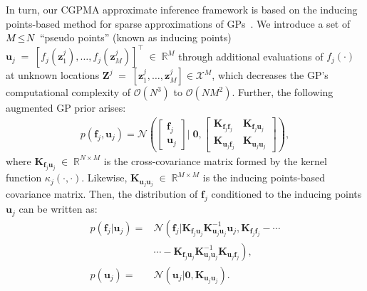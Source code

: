 \documentclass[journal]{IEEEtran}
\providecommand{\ve}[1]{{\bm{#1}}}%
\providecommand{\mat}[1]{{\bm{#1}}} %
\newcommand{\Real}{\mathbb{R}}
\DeclareMathOperator{\en}{\!\,\in\!\,}
\DeclareMathOperator{\igual}{\!\,=\!\,}
\providecommand{\s}[1]{\negthinspace#1\negthinspace}%
\providecommand{\ve}[1]{{\mathbf{#1}}}
\providecommand{\mat}[1]{{\mathbf{#1}}}
\newcommand{\gauss}{\mathcal{N}} %
\begin{document}
In turn, our CGPMA approximate inference framework is based on the inducing points-based method for sparse approximations of GPs~\cite{hensman2015scalable}. We introduce a set of $M\s{\leq}N$ ``pseudo points'' (known as inducing points) $\ve{u}_j \igual [f_j(\ve{z}_1^j), \dots , f_j(\ve{z}_M^j)]^{\top}\en \Real^{M}$ through additional evaluations of $f_j(\cdot)$ at unknown locations $\mat{Z}^j \igual [\ve{z}_1^j, \dots , \ve{z}_M^j]\in \mathcal{X}^{M}$, which decreases the GP's computational complexity of $\mathcal{O}(N^3)$ to $\mathcal{O}(NM^2)$. Further, the following augmented GP prior arises:
\begin{align}
p(\ve{f}_j,\ve{u}_j) = \gauss\left(\begin{bmatrix}
\ve{f}_j\\\ve{u}_j\end{bmatrix} \Bigg|\; \mathbf{0}, \begin{bmatrix}
\mat{K}_{\ve{f}_j\ve{f}_j} & \mat{K}_{\ve{f}_j\ve{u}_j}\\ \mat{K}_{\ve{u}_j\ve{f}_j} & \mat{K}_{\ve{u}_j\ve{u}_j}
\end{bmatrix}\right),
\end{align}
where $\mat{K}_{\ve{f}_j\ve{u}_j}\en\Real^{N\times M}$ is the cross-covariance matrix formed by the kernel function $\kappa_j(\cdot, \cdot)$. Likewise, $\mat{K}_{\ve{u}_j\ve{u}_j}\en\Real^{M\times M}$ is the inducing points-based covariance matrix. Then, the distribution of $\ve{f}_j$ conditioned to the inducing points $\ve{u}_j$ can be written as:
\begin{align}
\label{eq:FgU}
p(\ve{f}_j|\ve{u}_j) =&\gauss\left(\ve{f}_j|\mat{K}_{\ve{f}_j\ve{u}_j}\mat{K}_{\ve{u}_j\ve{u}_j}^{-1}\ve{u}_j,\mat{K}_{\ve{f}_j\ve{f}_j}-\cdots\right.\\ \nonumber
&\left.\cdots-\mat{K}_{\ve{f}_j\ve{u}_j}\mat{K}_{\ve{u}_j\ve{u}_j}^{-1}\mat{K}_{\ve{u}_j\ve{f}_j}\right),\\
p(\ve{u}_j) =& \gauss\left(\ve{u}_j|\ve{0}, \mat{K}_{\ve{u}_j\ve{u}_j}\right).
\label{eq:U}
\end{align}
\end{document}
